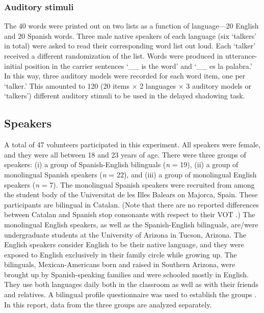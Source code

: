 \documentclass[a4paper]{article}
\begin{document}
\subsubsection{Auditory stimuli}

The 40 words were printed out on two lists as a function of language---20 English and 20 Spanish words. Three male native speakers of each language (six `talkers' in total) were asked to read their corresponding word list out loud. Each `talker' received a different randomization of the list. Words were produced in utterance-initial position in the carrier sentences `\_\_ is the word' and `\_\_ es la palabra.' In this way, three auditory models were recorded for each word item, one per `talker.' This amounted to 120 (20 items $\times$ 2 languages $\times$ 3 auditory models or `talkers') different auditory stimuli to be used in the delayed shadowing task. 

\subsection{Speakers}

A total of 47 volunteers participated in this experiment. All speakers were female, and they were all between 18 and 23 years of age. There were three groups of speakers: (i) a group of Spanish-English bilinguals (\emph{n} = 19), (ii) a group of monolingual Spanish speakers (\emph{n} = 22), and (iii) a group of monolingual English speakers (\emph{n} = 7). The monolingual Spanish speakers were recruited from among the student body of the Universitat de les Illes Balears on Majorca, Spain. These participants are bilingual in Catalan. (Note that there are no reported differences between Catalan and Spanish stop consonants with respect to their VOT \cite{amengual2012interlingual}.) The monolingual English speakers, as well as the Spanish-English bilinguals, are/were undergraduate students at the University of Arizona in Tucson, Arizona. The English speakers consider English to be their native language, and they were exposed to English exclusively in their family circle while growing up. The bilinguals, Mexican-Americans born and raised in Southern Arizona, were brought up by Spanish-speaking families and were schooled mostly in English. They use both languages daily both in the classroom as well as with their friends and relatives. A bilingual profile questionnaire was used to establish the groups \cite{birdsong2012bilingual}. In this report, data from the three groups are analyzed separately.  
\end{document}
